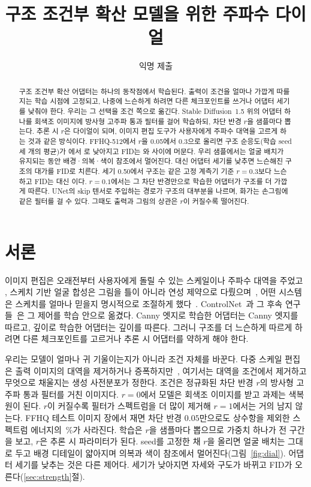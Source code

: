 \documentclass[10pt,twocolumn,a4paper]{article}
\title{\vspace{-1.5em}\bfseries 구조 조건부 확산 모델을 위한 주파수 다이얼}
\author{익명 제출}
\date{}
\begin{document}
\maketitle

\begin{abstract}
\noindent
구조 조건부 확산 어댑터는 하나의 동작점에서 학습된다. 출력이 조건을 얼마나 가깝게
따를지는 학습 시점에 고정되고, 나중에 느슨하게 하려면 다른 체크포인트를 쓰거나 어댑터
세기를 낮춰야 한다. 우리는 그 선택을 조건 쪽으로 옮긴다. Stable Diffusion~1.5 위의 어댑터
하나를 회색조 이미지에 방사형 고주파 통과 필터를 걸어 학습하되, 차단 반경 $r$을 샘플마다
뽑는다. 추론 시 $r$은 다이얼이 되며, 이미지 편집 도구가 사용자에게 주파수 대역을 고르게
하는 것과 같은 방식이다. FFHQ-512에서 $r$을 0.05에서 0.3으로 올리면 구조 순응도(학습 seed
세 개의 평균)가 \seedMeanZeroFive{}에서 \seedMeanThreeZero{}로 낮아지고 FID는
\fidMainZeroFive{}와 \fidMainOneZero{} 사이에 머문다. 우리 샘플에서는 얼굴 배치가
유지되는 동안 배경·의복·색이 참조에서 멀어진다. 대신 어댑터 세기를 낮추면 느슨해진 구조의
대가를 FID로 치른다. 세기 0.50에서 구조는 같은 고정 계측기 기준 $r{=}0.3$보다 느슨하고
FID는 \fidMainThreeZero{} 대신 \fidHalfScale{}이다. $r{=}0.1$에서는 그 차단 반경만으로
학습한 어댑터가 구조를 더 가깝게 따른다. UNet의 skip 텐서로 주입하는 경로가 구조의 대부분을
나르며, 화가는 손그림에 같은 필터를 걸 수 있다. 그때도 출력과 그림의 상관은 $r$이 커질수록
떨어진다.
\end{abstract}

\section{서론}

이미지 편집은 오래전부터 사용자에게 돌릴 수 있는 스케일이나 주파수 대역을 주었고
\cite{farbman2008edge,paris2011local}, 스케치 기반 얼굴 합성은 그림을 틀이 아니라 연성
제약으로 다뤘으며~\cite{chen2020deepfacedrawing}, 어떤 시스템은 스케치를 얼마나 믿을지
명시적으로 조절하게 했다~\cite{yang2020deep}. ControlNet~\cite{zhang2023adding}과 그 후속
연구들~\cite{mou2023adapter,zhao2023controlnet,qin2023unicontrol,li2024controlnet}은 그 제어를
학습 안으로 옮겼다. Canny 엣지로 학습한 어댑터는 Canny 엣지를 따르고, 깊이로 학습한
어댑터는 깊이를 따른다. 그러니 구조를 더 느슨하게 따르게 하려면 다른 체크포인트를
고르거나 추론 시 어댑터를 약하게 해야 한다.

우리는 모델이 얼마나 귀 기울이는지가 아니라 조건 자체를 바꾼다. 다중 스케일 편집은
출력 이미지의 대역을 제거하거나 증폭하지만~\cite{farbman2008edge,paris2011local}, 여기서는
대역을 조건에서 제거하고 무엇으로 채울지는 생성 사전분포가 정한다. 조건은 정규화된
차단 반경 $r$의 방사형 고주파 통과 필터를 거친 이미지다. $r{=}0$에서 모델은 회색조
이미지를 받고 과제는 색복원이 된다. $r$이 커질수록 필터가 스펙트럼을 더 많이 제거해
$r{=}1$에서는 거의 남지 않는다. FFHQ 테스트 이미지 \energyN{}장에서 재면 차단 반경
$0.05$만으로도 상수항을 제외한 스펙트럼 에너지의 \acRemovedZeroFive\,\%가 사라진다.
학습은 $r$을 샘플마다 뽑으므로 가중치 하나가 전 구간을 보고, $r$은 추론 시 파라미터가
된다. seed를 고정한 채 $r$을 올리면 얼굴 배치는 그대로 두고 배경 디테일이 얇아지며
의복과 색이 참조에서 멀어진다(그림~\ref{fig:dial}). 어댑터 세기를 낮추는 것은 다른
제어다. 세기가 낮아지면 자세와 구도가 바뀌고 FID가 오른다(\ref{sec:strength}절).
\end{document}
